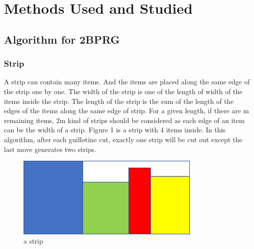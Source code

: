 \documentclass[11pt]{article}
\begin{document}
\section{Methods Used and Studied}
    \subsection{Algorithm for 2BPRG}

        \subsubsection{Strip}
        A strip can contain many items. And the items are placed along the same edge of the strip one by one. The width of the strip is one of the length of width of the items inside the strip. The length of the strip is the sum of the length of the edges of the items along the same edge of strip. For a given length, if there are m remaining items, 2m kind of strips should be considered as each edge of an item can be the width of a strip. Figure 1 is a strip with 4 items inside.
        \newline
	    In this algorithm, after each guillotine cut, exactly one strip will be cut out except the last move generates two strips.
        \begin{figure}
        \begin{minipage}[hb]{0.5\linewidth}
        \centering
        \includegraphics[width=0.8\textwidth]{FIGS/examples/1.png}
        \caption{a strip}
        \label{skyline}
        \end{minipage}

        \end{figure}
\end{document}
